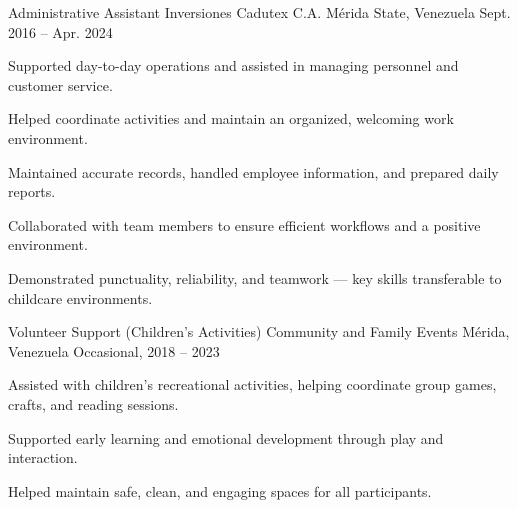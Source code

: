 \newcommand{\quotes}[1]{``#1''}
\begin{cventries}

  \cventry
  {Administrative Assistant}
  {Inversiones Cadutex C.A.}
  {Mérida State, Venezuela}
  {Sept. 2016 -- Apr. 2024}
  {
    \begin{cvitems}
      \item {Supported day-to-day operations and assisted in managing personnel and customer service.}
      \item {Helped coordinate activities and maintain an organized, welcoming work environment.}
      \item {Maintained accurate records, handled employee information, and prepared daily reports.}
      \item {Collaborated with team members to ensure efficient workflows and a positive environment.}
      \item {Demonstrated punctuality, reliability, and teamwork — key skills transferable to childcare environments.}
    \end{cvitems}
  }

  \cventry
  {Volunteer Support (Children’s Activities)}
  {Community and Family Events}
  {Mérida, Venezuela}
  {Occasional, 2018 -- 2023}
  {
    \begin{cvitems}
      \item {Assisted with children’s recreational activities, helping coordinate group games, crafts, and reading sessions.}
      \item {Supported early learning and emotional development through play and interaction.}
      \item {Helped maintain safe, clean, and engaging spaces for all participants.}
    \end{cvitems}
  }

\end{cventries}
